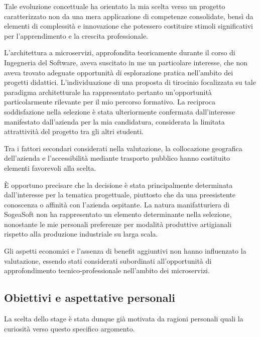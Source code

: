     Tale evoluzione concettuale ha orientato la mia scelta verso un progetto caratterizzato non da una mera applicazione di competenze consolidate, bensì da elementi di complessità e innovazione che potessero costituire stimoli significativi per l'apprendimento e la crescita professionale.

    L'architettura a microservizi, approfondita teoricamente durante il corso di Ingegneria del Software, aveva suscitato in me un particolare interesse, che non aveva trovato adeguate opportunità di esplorazione pratica nell'ambito dei progetti didattici. L'individuazione di una proposta di tirocinio focalizzata su tale paradigma architetturale ha rappresentato pertanto un'opportunità particolarmente rilevante per il mio percorso formativo. La reciproca soddisfazione nella selezione è stata ulteriormente confermata dall'interesse manifestato dall'azienda per la mia candidatura, considerata la limitata attrattività del progetto tra gli altri studenti.

    Tra i fattori secondari considerati nella valutazione, la collocazione geografica dell'azienda e l'accessibilità mediante trasporto pubblico hanno costituito elementi favorevoli alla scelta.

    È opportuno precisare che la decisione è stata principalmente determinata dall'interesse per la tematica progettuale, piuttosto che da una preesistente conoscenza o affinità con l'azienda ospitante. La natura manifatturiera di SogeaSoft non ha rappresentato un elemento determinante nella selezione, nonostante le mie personali preferenze per modalità produttive artigianali rispetto alla produzione industriale su larga scala.

    Gli aspetti economici e l'assenza di benefit aggiuntivi non hanno influenzato la valutazione, essendo stati considerati subordinati all'opportunità di approfondimento tecnico-professionale nell'ambito dei microservizi.
    
        \subsection{Obiettivi e aspettative personali}
        La scelta dello stage è stata dunque già motivata da ragioni personali quali la curiosità verso questo specifico argomento.

